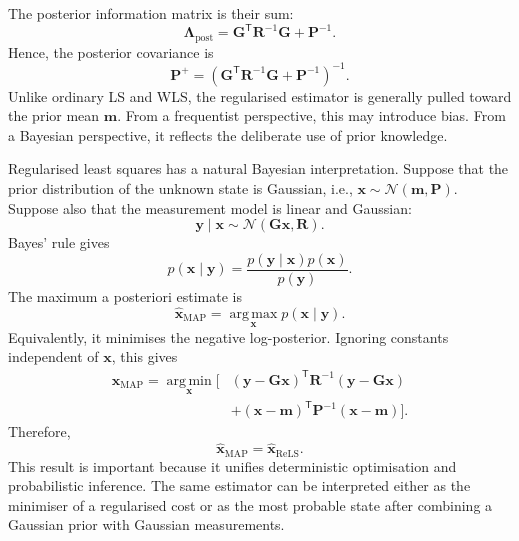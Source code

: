 \documentclass[11pt,oneside,openany]{book}
\begin{document}
The posterior information matrix is their sum:
\begin{equation}
\mathbf{\Lambda}_{\mathrm{post}}
=
\mathbf{G}^{\mathsf T}
\mathbf{R}^{-1}
\mathbf{G}
+
\mathbf{P}^{-1}.
\end{equation}
Hence, the posterior covariance is
\begin{equation}
\mathbf{P}^{+}
=
\left(
\mathbf{G}^{\mathsf T}
\mathbf{R}^{-1}
\mathbf{G}
+
\mathbf{P}^{-1}
\right)^{-1}.
\end{equation}
Unlike ordinary LS and WLS, the regularised estimator is generally pulled toward the prior mean $\mathbf{m}$. From a frequentist perspective, this may introduce bias. From a Bayesian perspective, it reflects the deliberate use of prior knowledge.

Regularised least squares has a natural Bayesian interpretation. Suppose that the prior distribution of the unknown state is Gaussian, i.e., $\mathbf{x}
\sim
\mathcal{N}
\left(
\mathbf{m},
\mathbf{P}
\right)$. Suppose also that the measurement model is linear and Gaussian:
\begin{equation}
\mathbf{y}\mid\mathbf{x}
\sim
\mathcal{N}
\left(
\mathbf{G}\mathbf{x},
\mathbf{R}
\right).
\end{equation}
Bayes' rule gives
\begin{equation}
p(\mathbf{x}\mid\mathbf{y})
=
\frac{
p(\mathbf{y}\mid\mathbf{x})p(\mathbf{x})
}{
p(\mathbf{y})
}.
\end{equation}
The maximum a posteriori estimate is
\begin{equation}
\widehat{\mathbf{x}}_{\mathrm{MAP}}
=
\operatorname*{arg\,max}_{\mathbf{x}}
p(\mathbf{x}\mid\mathbf{y}).
\end{equation}
Equivalently, it minimises the negative log-posterior. Ignoring constants independent of $\mathbf{x}$, this gives
\begin{align}
\widehat{\mathbf{x}}_{\mathrm{MAP}}
=
\operatorname*{arg\,min}_{\mathbf{x}}
\bigg[
&\left(
\mathbf{y}
-
\mathbf{G}\mathbf{x}
\right)^{\mathsf T}
\mathbf{R}^{-1}
\left(
\mathbf{y}
-
\mathbf{G}\mathbf{x}
\right) \nonumber \\
&+
\left(
\mathbf{x}
-
\mathbf{m}
\right)^{\mathsf T}
\mathbf{P}^{-1}
\left(
\mathbf{x}
-
\mathbf{m}
\right)
\bigg].
\end{align}
Therefore,
\begin{equation}
\widehat{\mathbf{x}}_{\mathrm{MAP}}
=
\widehat{\mathbf{x}}_{\mathrm{ReLS}}.
\end{equation}
This result is important because it unifies deterministic optimisation and probabilistic inference. The same estimator can be interpreted either as the minimiser of a regularised cost or as the most probable state after combining a Gaussian prior with Gaussian measurements.
\end{document}

